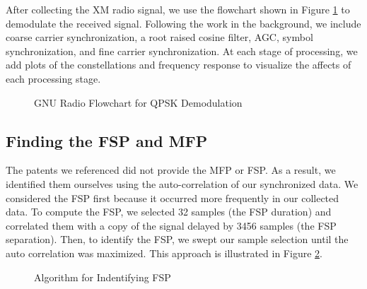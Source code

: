 \documentclass[conference,onecolumn]{IEEEtran}
\begin{document}
After collecting the XM radio signal, we use the flowchart shown in Figure \ref{fig::timing_carrier_sync} to demodulate the received signal. Following the work in the background, we include coarse carrier synchronization, a root raised cosine filter, AGC, symbol synchronization, and fine carrier synchronization. At each stage of processing, we add plots of the constellations and frequency response to visualize the affects of each processing stage. 

\begin{figure}[H]
	\centerline{}
	\caption{GNU Radio Flowchart for QPSK Demodulation}
	\label{fig::timing_carrier_sync}
\end{figure}

\subsection{Finding the FSP and MFP}

The patents we referenced did not provide the MFP or FSP. As a result, we identified them ourselves using the auto-correlation of our synchronized data. We considered the FSP first because it occurred more frequently in our collected data. To compute the FSP, we selected 32 samples (the FSP duration) and correlated them with a copy of the signal delayed by 3456 samples (the FSP separation). Then, to identify the FSP, we swept our sample selection until the auto correlation was maximized. This approach is illustrated in Figure \ref{fig::finding_fsp}.

\begin{figure}[H]
	\centerline{}
	\caption{Algorithm for Indentifying FSP}
	\label{fig::finding_fsp}
\end{figure}
\end{document}

